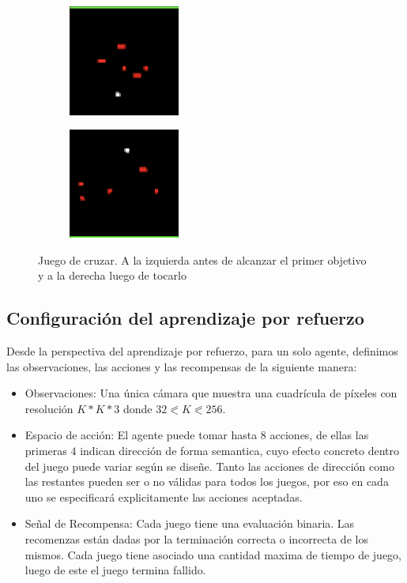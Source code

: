 \begin{figure}[ht!]
    \centering
    \begin{subfigure}
      \centering
      \includegraphics[width=0.4\textwidth]{Graphics/uthopia_street_1.png}
      \label{fig:uthopia_street_1}
    \end{subfigure}%
    \begin{subfigure}
      \centering
      \includegraphics[width=0.4\textwidth]{Graphics/uthopia_street_2.png}
      \label{fig:uthopia_street_2}
    \end{subfigure}%
    \caption{Juego de cruzar. A la izquierda antes de alcanzar el primer objetivo y a la derecha luego de tocarlo}
    \label{fig:uthopia_street}
\end{figure}

\subsection{Configuración del aprendizaje por refuerzo}

Desde la perspectiva del aprendizaje por refuerzo, para un solo agente, definimos las observaciones, las acciones y las recompensas de la siguiente manera:

\begin{itemize}
    \item Observaciones: Una única cámara que muestra una cuadrícula de píxeles con resolución $K * K * 3$ donde $32 \eqslantless K \eqslantless 256$.
    \item Espacio de acción: El agente puede tomar hasta $8$ acciones, de ellas las primeras $4$ indican dirección de forma semantica, cuyo efecto concreto dentro del juego puede variar según se diseñe. Tanto las acciones de dirección como las restantes pueden ser o no válidas para todos los juegos, por eso en cada uno se especificará explicitamente las acciones aceptadas.
    \item Señal de Recompensa: Cada juego tiene una evaluación binaria. Las recomenzas están dadas por la terminación correcta o incorrecta de los mismos. Cada juego tiene asociado una cantidad maxima de tiempo de juego, luego de este el juego termina fallido.
\end{itemize} 


